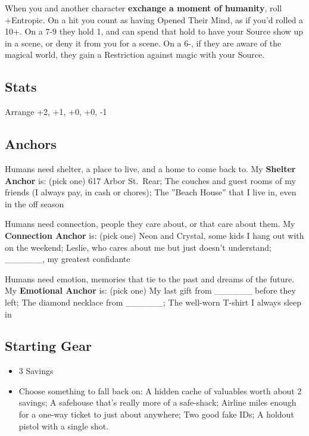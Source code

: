 \documentclass[
  oneside,
  statementpaper,
  9pt]{memoir}
\begin{document}
When you and another character \textbf{exchange a moment of humanity},
roll +Entropic. On a hit you count as having Opened Their Mind, as if
you'd rolled a 10+. On a 7-9 they hold 1, and can spend that hold to
have your Source show up in a scene, or deny it from you for a scene. On
a 6-, if they are aware of the magical world, they gain a Restriction
against magic with your Source.

\hypertarget{stats-4}{%
\subsection{Stats}\label{stats-4}}

Arrange +2, +1, +0, +0, -1

\hypertarget{anchors-4}{%
\subsection{Anchors}\label{anchors-4}}

Humans need shelter, a place to live, and a home to come back to. My
\textbf{Shelter Anchor} is: (pick one) 617 Arbor St.~Rear; The couches
and guest rooms of my friends (I always pay, in cash or chores); The
''Beach House'' that I live in, even in the off season

Humans need connection, people they care about, or that care about them.
My \textbf{Connection Anchor} is: (pick one) Neon and Crystal, some kids
I hang out with on the weekend; Leslie, who cares about me but just
doesn't understand; \_\_\_\_\_\_, my greatest confidante

Humans need emotion, memories that tie to the past and dreams of the
future. My \textbf{Emotional Anchor} is: (pick one) My last gift from
\_\_\_\_\_\_ before they left; The diamond necklace from \_\_\_\_\_\_;
The well-worn T-shirt I always sleep in

\hypertarget{starting-gear-2}{%
\subsection{Starting Gear}\label{starting-gear-2}}

\begin{itemize}
\tightlist
\item
  3 Savings
\item
  Choose something to fall back on: A hidden cache of valuables worth
  about 2 savings; A safehouse that's really more of a safe-shack;
  Airline miles enough for a one-way ticket to just about anywhere; Two
  good fake IDs; A holdout pistol with a single shot.
\end{itemize}
\end{document}
